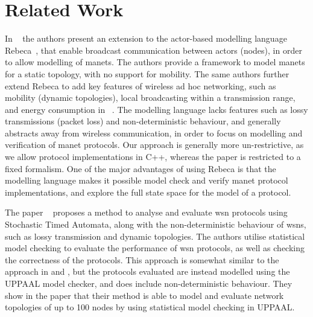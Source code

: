 \section{Related Work}\label{sec:relatedworks}




In ~\cite{DBLP:conf/fsen/YousefiGK15} the authors present an extension to the actor-based modelling language Rebeca~\cite{Sirjani2004ModelingAV}, that enable broadcast communication between actors (nodes), in order to allow modelling of \gls{manet}s. The authors provide a framework to model \gls{manet}s for a static topology, with no support for mobility. The same authors further extend Rebeca to add key features of wireless ad hoc networking, such as mobility (dynamic topologies), local broadcasting within a transmission range, and energy consumption in ~\cite{DBLP:journals/fac/YousefiGK17}. The modelling language lacks features such as lossy transmissions (packet loss) and non-deterministic behaviour, and generally abstracts away from wireless communication, in order to focus on modelling and verification of \gls{manet} protocols. Our approach is generally more un-restrictive, as we allow protocol implementations in C++, whereas the paper is restricted to a fixed formalism. One of the major advantages of using Rebeca is that the modelling language makes it possible model check and verify \gls{manet} protocol implementations, and explore the full state space for the model of a protocol.\medbreak

The paper ~\cite{article:maeofwsnpbsta} proposes a method to analyse and evaluate \gls{wsn} protocols using Stochastic Timed Automata, along with the non-deterministic behaviour of \gls{wsn}s, such as lossy transmission and dynamic topologies. The authors utilise statistical model checking to evaluate the performance of \gls{wsn} protocols, as well as checking the correctness of the protocols. This approach is somewhat similar to the approach in \cite{DBLP:conf/fsen/YousefiGK15} and \cite{DBLP:journals/fac/YousefiGK17}, but the protocols evaluated are instead modelled using the UPPAAL model checker, and does include non-deterministic behaviour. They show in the paper that their method is able to model and evaluate network topologies of up to 100 nodes by using statistical model checking in UPPAAL.   \medbreak

